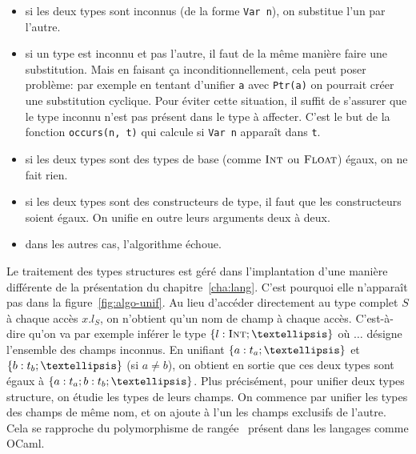 \begin{itemize}

\item si les deux types sont inconnus (de la forme \texttt{Var n}), on substitue
l'un par l'autre.

\item si un type est inconnu et pas l'autre, il faut de la même manière faire
une substitution.
Mais en faisant ça inconditionnellement, cela peut poser problème:
par exemple en tentant d'unifier \texttt{a} avec \verb!Ptr(a)! on pourrait
créer une substitution cyclique.
Pour éviter cette situation, il suffit de s'assurer que le type inconnu n'est
pas présent dans le type à affecter. C'est le but de la fonction
\texttt{occurs(n, t)} qui calcule si \texttt{Var n} apparaît dans \texttt{t}.

\item si les deux types sont des types de base (comme $\textsc{Int}$ ou $\textsc{Float}$)
égaux, on ne fait rien.

\item si les deux types sont des constructeurs de type, il faut que les
constructeurs soient égaux. On unifie en outre leurs arguments deux à deux.

\item dans les autres cas, l'algorithme échoue.

\end{itemize}

Le traitement des types structures est géré dans l'implantation d'une manière
différente de la présentation du chapitre~\ref{cha:lang}. C'est pourquoi elle
n'apparaît pas dans la figure~\ref{fig:algo-unif}. Au lieu d'accéder directement
au type complet $S$ à chaque accès $x.l_S$, on n'obtient qu'un nom de champ à
chaque accès. C'est-à-dire qu'on va par exemple inférer le type $\tStruct{ l:
\tInt ; … }$ où $…$ désigne l'ensemble des champs inconnus. En unifiant
$\tStruct{ a: t_a ; … }$ et $\tStruct{ b: t_b ; … }$ (si $a ≠ b$), on obtient en
sortie que ces deux types sont égaux à $\tStruct{ a: t_a; b: t_b ; … }$. Plus
précisément, pour unifier deux types structure, on étudie les types de leurs
champs. On commence par unifier les types des champs de même nom, et on ajoute à
l'un les champs exclusifs de l'autre. Cela se rapproche du polymorphisme de
rangée~\cite{ocamlObjects} présent dans les langages comme OCaml.



